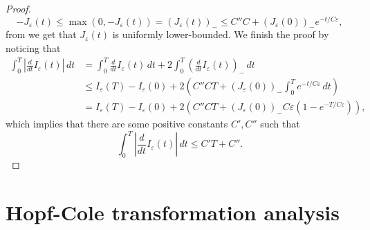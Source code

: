 \documentclass[onefignum,onetabnum]{siamart190516}
\newcommand{\1}{\mathbbm{1}}
\newcommand{\eps}{\varepsilon}
\begin{document}
\begin{proof}
$$
-J_\eps(t)\leq\max(0,-J_\eps(t))=(J_\eps(t))_-\leq C''C+(J_\eps(0))_-e^{-t/C\eps},
$$
from we get that $J_\eps(t)$ is uniformly lower-bounded.
We finish the proof by noticing that
\begin{align*}
\int_0^T\left|\frac{d}{dt}I_\eps(t)\right|\,dt &=\int_0^T \frac{d}{dt}I_\eps(t)\,dt +2\int_0^T\left(\frac{d}{dt}I_\eps(t)\right)_-\,dt 
\\
&\leq I_\eps(T)-I_\eps(0)+2\left(C''CT+(J_\eps(0))_-\int_0^Te^{-t/C\eps}\,dt\right)
\\
&=I_\eps(T)-I_\eps(0)+2\left(C''CT+(J_\eps(0))_-C\eps (1-e^{-T/C\eps})\right),
\end{align*}
which implies that there are some positive constants $C',C''$ such that
$$
\int_0^T\left|\frac{d}{dt}I_\eps(t)\right|\,dt \leq C'T+C''.
$$
$\,$
\end{proof}


\section{Hopf-Cole transformation analysis}
\label{sec:hopf}
\end{document}
